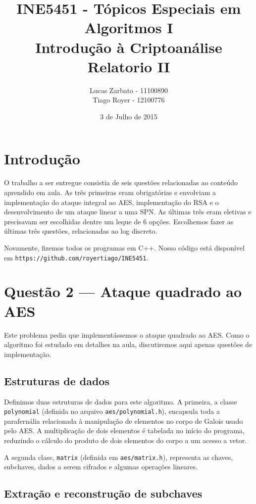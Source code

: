 \documentclass{article}
\title{
    INE5451 - Tópicos Especiais em Algoritmos I \\
    Introdução à Criptoanálise \\
    Relatorio II
}
\author{
    Lucas Zarbato - 11100890\\
    Tiago Royer - 12100776
}
\date{3 de Julho de 2015}
\begin{document}
\maketitle

\section{Introdução}

O trabalho a ser entregue consistia de seis questões
relacionadas ao conteúdo aprendido em aula.
As três primeiras eram obrigatórias
e envolviam a implementação do ataque integral ao AES,
implementação do RSA
e o desenvolvimento de um ataque linear a uma SPN.
As últimas três eram eletivas e precisavam ser escolhidas
dentre um leque de 6 opções.
Escolhemos fazer as últimas três questões, relacionadas ao log discreto.

Novamente, fizemos todos os programas em C++.
Nosso código está disponível em \texttt{https://github.com/royertiago/INE5451}.

\section{Questão 2 --- Ataque quadrado ao AES}

Este problema pedia que implementássemos o ataque quadrado ao AES.
Como o algoritmo foi estudado em detalhes na aula,
discutiremos aqui apenas questões de implementação.

\subsection{Estruturas de dados}

Definimos duas estruturas de dados para este algoritmo.
A primeira,
a classe \verb"polynomial"
(definida no arquivo \verb"aes/polynomial.h"),
encapsula toda a parafernália relacionada
à manipulação de elementos no corpo de Galois usado pelo AES.
A multiplicação de dois elementos é tabelada no início do programa,
reduzindo o cálculo do produto de dois elementos do corpo
a um acesso a vetor.

A segunda clase,
\verb"matrix" (definida em \verb"aes/matrix.h"),
representa as chaves, subchaves, dados a serem cifrados
e algumas operações lineares.

\subsection{Extração e reconstrução de subchaves}
\end{document}
